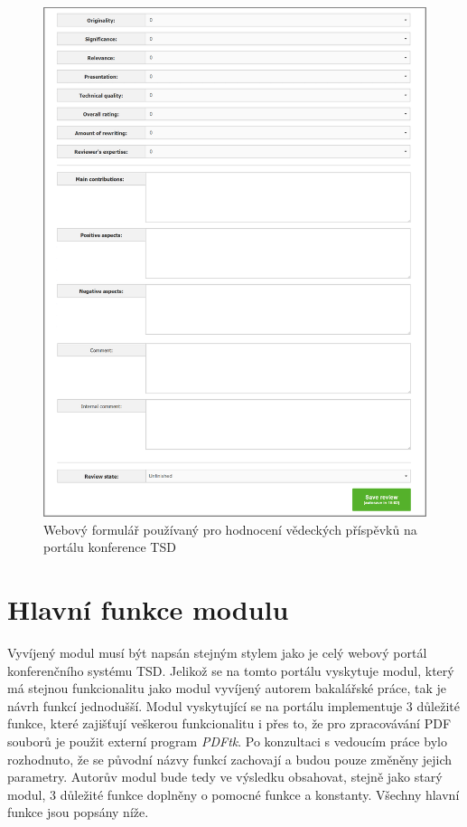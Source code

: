 \begin{figure}[h!]
\centering
\includegraphics[width=15cm]{img/web_formular}
\caption{Webový formulář používaný pro hodnocení vědeckých příspěvků na portálu konference TSD}
\label{fig:web_formular}
\end{figure}

\section{Hlavní funkce modulu}
Vyvíjený modul musí být napsán stejným stylem jako je celý webový portál konferenčního systému TSD. Jelikož se na tomto portálu vyskytuje modul, který má stejnou funkcionalitu jako modul vyvíjený autorem bakalářské práce, tak je návrh funkcí jednodušší. Modul vyskytující se na portálu implementuje 3 důležité funkce, které zajišťují veškerou funkcionalitu i přes to, že pro zpracovávání PDF souborů je použit externí program \textit{PDFtk}. Po konzultaci s vedoucím práce bylo rozhodnuto, že se původní názvy funkcí zachovají a budou pouze změněny jejich parametry. Autorův modul bude tedy ve výsledku obsahovat, stejně jako starý modul, 3 důležité funkce doplněny o pomocné funkce a konstanty. Všechny hlavní funkce jsou popsány níže.  

